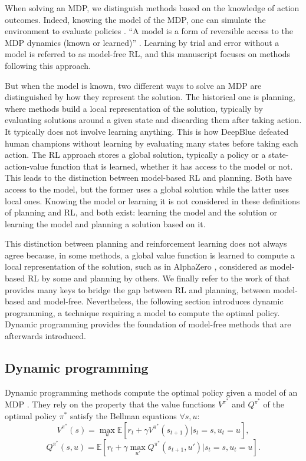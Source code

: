 When solving an MDP, we distinguish methods based on the knowledge of action outcomes.
Indeed, knowing the model of the MDP, one can simulate the environment to evaluate policies \citep{sutton2018reinforcement}.
``A model is a form of reversible access to the MDP dynamics (known or learned)'' \citep{moerland2023model}.
Learning by trial and error without a model is referred to as model-free RL, and this manuscript focuses on methods following this approach.

But when the model is known, two different ways to solve an MDP are distinguished by how they represent the solution.
The historical one is planning, where methods build a local representation of the solution, typically by evaluating solutions around a given state and discarding them after taking action.
It typically does not involve learning anything.
This is how DeepBlue \citep{campbell2002deep} defeated human champions without learning by evaluating many states before taking each action.
The RL approach stores a global solution, typically a policy or a state-action-value function that is learned, whether it has access to the model or not.
This leads to the distinction between model-based RL and planning.
Both have access to the model, but the former uses a global solution while the latter uses local ones.
Knowing the model or learning it is not considered in these definitions of planning and RL, and both exist: learning the model and the solution or learning the model and planning a solution based on it.

This distinction between planning and reinforcement learning does not always agree because, in some methods, a global value function is learned to compute a local representation of the solution, such as in AlphaZero \citep{silver2018general}, considered as model-based RL by some and planning by others.
We finally refer to the work of \cite{moerland2023model} that provides many keys to bridge the gap between RL and planning, between model-based and model-free.
Nevertheless, the following section introduces dynamic programming, a technique requiring a model to compute the optimal policy.
Dynamic programming provides the foundation of model-free methods that are afterwards introduced.

\subsection{Dynamic programming}
Dynamic programming \citep{bellman1966dynamic} methods compute the optimal policy given a model of an MDP \citep{sutton2018reinforcement}.
They rely on the property that the value functions $V^{\pi^*}$ and $Q^{\pi^*}$ of the optimal policy ${\pi^*}$ satisfy the Bellman equations $\forall s, u$:
\begin{equation}
\label{eq:ch2_bellmanV}
    V^{\pi^*}(s) = \max_u \mathbb{E}[r_t + \gamma V^{\pi^*}(s_{t+1})| s_t=s, u_t=u],
\end{equation}
\begin{equation}
\label{eq:ch2_bellmanQ}
    Q^{\pi^*}(s, u) = \mathbb{E}[r_t + \gamma \max_{u'} Q^{\pi^*}(s_{t+1}, u') |s_t=s, u_t=u].
\end{equation}

